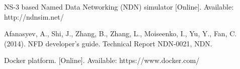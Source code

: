 \documentclass[11pt,conference]{./IEEEtran}
\begin{document}
\begin{thebibliography}{99}



NS-3 based Named Data Networking (NDN) simulator 
[Online]. Available:
http://ndnsim.net/







Afanasyev, A., Shi, J., Zhang, B., Zhang, L., Moiseenko, I., Yu, Y., Fan, C. (2014). NFD developer’s guide. Technical Report NDN-0021, NDN.

Docker platform.
[Online]. Available:
https://www.docker.com/



\end{thebibliography}
\end{document}
